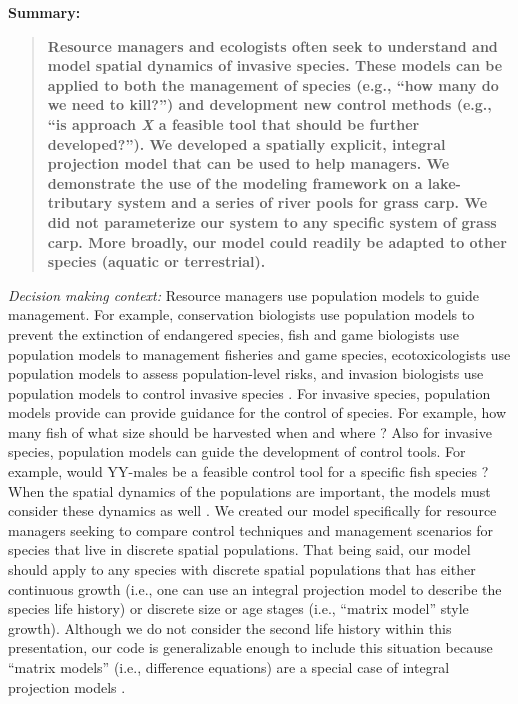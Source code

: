 \documentclass{article}[12pt]
\begin{document}
\textbf{Summary:}
\begin{verse}
\textbf{ 
Resource managers and ecologists often seek to understand and model spatial dynamics of invasive species.
These models can be applied to both the management of species (e.g., ``how many do we need to kill?'') and development new control methods (e.g., ``is approach \textit{X} a feasible tool that should be further developed?''). 
We developed a spatially explicit, integral projection model that can be used to help managers. 
We demonstrate the use of the modeling framework on a lake-tributary system and a series of river pools for grass carp.
We did not parameterize our system to any specific system of grass carp.
More broadly, our model could readily be adapted to other species (aquatic or terrestrial). 
}
\end{verse}

\textit{Decision making context:}
Resource managers use population models to guide management.
For example, conservation biologists use population models to prevent the extinction of endangered species, fish and game biologists use population models to management fisheries and game species, ecotoxicologists use population models to assess population-level risks, and  invasion biologists use population models to control invasive species \citep{morris2002quantitative}.
For invasive species, population models provide can provide guidance for the control of species.
For example, how many fish of what size should be harvested when and where \citep[e.g.,][]{tsehaye2013prospects}?
Also for invasive species, population models can guide the development of control tools.
For example, would YY-males be a feasible control tool for a specific fish species \citep[e.g.,][]{Erickson:2017ecomod, schill2017simulated}?
When the spatial dynamics of the populations are important, the models must consider these dynamics as well \citep{strasser2012contributions}. 
We created our model specifically for resource managers seeking to compare control techniques and management scenarios for species that live in discrete spatial populations. 
That being said, our model should apply to any species with discrete spatial populations that has either continuous growth (i.e., one can use an integral projection model to describe the species life history) or discrete size or age stages (i.e., ``matrix model'' style growth). 
Although we do not consider the second life history within this presentation, our code is generalizable enough to include this situation because ``matrix models'' (i.e., difference equations) are a special case of integral projection models \citep{Ellner:2010IPM}.
\end{document}
